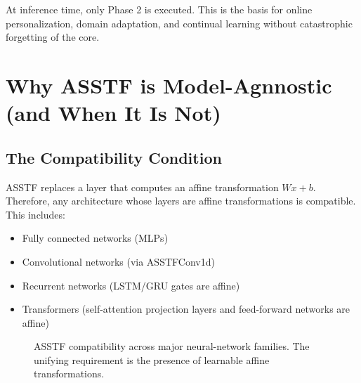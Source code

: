\documentclass[11pt,a4paper]{article}
\theoremstyle{definition}
\begin{document}
At inference time, only Phase 2 is executed. This is the basis for online personalization, domain adaptation, and continual learning without catastrophic forgetting of the core.

\section{Why ASSTF is Model-Agnnostic (and When It Is Not)}
\label{sec:universality}

\subsection{The Compatibility Condition}
\label{subsec:compatibility}

ASSTF replaces a layer that computes an affine transformation $W x + b$. Therefore, any architecture whose layers are affine transformations is compatible. This includes:

\begin{itemize}
    \item Fully connected networks (MLPs)
    \item Convolutional networks (via ASSTFConv1d)
    \item Recurrent networks (LSTM/GRU gates are affine)
    \item Transformers (self-attention projection layers and feed-forward networks are affine)
\end{itemize}

\begin{figure}[t]
\centering
{}
\caption{ASSTF compatibility across major neural-network families. The unifying requirement is the presence of learnable affine transformations.}
\label{fig:compatibility}
\end{figure}
\end{document}
